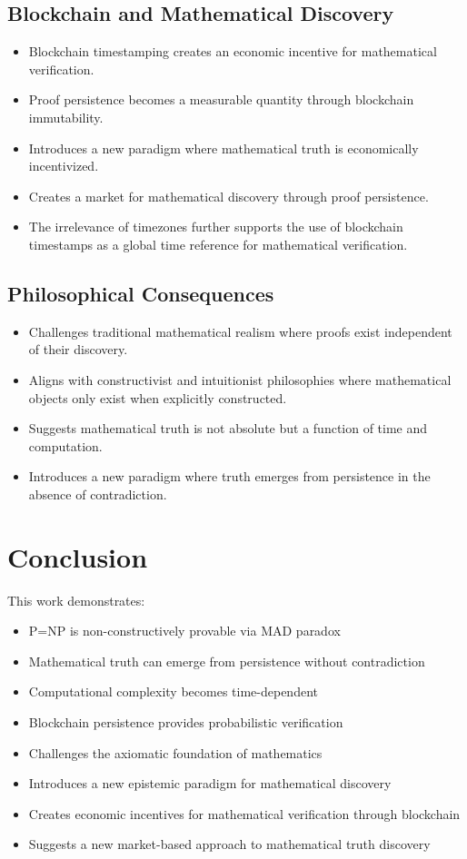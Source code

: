 \documentclass{article}
\begin{document}
\subsection{Blockchain and Mathematical Discovery}
\begin{itemize}
    \item Blockchain timestamping creates an economic incentive for mathematical verification.
    \item Proof persistence becomes a measurable quantity through blockchain immutability.
    \item Introduces a new paradigm where mathematical truth is economically incentivized.
    \item Creates a market for mathematical discovery through proof persistence.
    \item The irrelevance of timezones \cite{Houk2025Timezones} further supports the use of blockchain timestamps as a global time reference for mathematical verification.
\end{itemize}

\subsection{Philosophical Consequences}
\begin{itemize}
    \item Challenges traditional mathematical realism where proofs exist independent of their discovery.
    \item Aligns with constructivist and intuitionist philosophies where mathematical objects only exist when explicitly constructed.
    \item Suggests mathematical truth is not absolute but a function of time and computation.
    \item Introduces a new paradigm where truth emerges from persistence in the absence of contradiction.
\end{itemize}

\section{Conclusion}
This work demonstrates:
\begin{itemize}
    \item P=NP is non-constructively provable via MAD paradox
    \item Mathematical truth can emerge from persistence without contradiction
    \item Computational complexity becomes time-dependent
    \item Blockchain persistence provides probabilistic verification
    \item Challenges the axiomatic foundation of mathematics
    \item Introduces a new epistemic paradigm for mathematical discovery
    \item Creates economic incentives for mathematical verification through blockchain
    \item Suggests a new market-based approach to mathematical truth discovery
\end{itemize}
\end{document}

